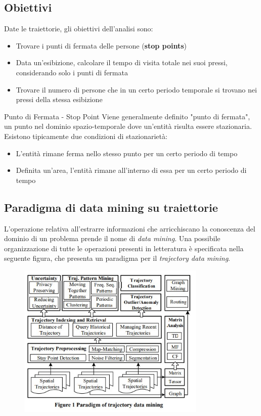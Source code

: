 \documentclass[12pt]{article}
\begin{document}
\subsection{Obiettivi}
Date le traiettorie, gli obiettivi dell'analisi sono:
\begin{itemize}
    \item Trovare i punti di fermata delle persone (\textbf{stop points})
    \item Data un'esibizione, calcolare il tempo di visita totale nei suoi pressi, considerando solo i punti di fermata
    \item Trovare il numero di persone che in un certo periodo temporale si trovano nei pressi della stessa esibizione
\end{itemize}
\begin{definition}{Punto di Fermata - Stop Point}{}
    Viene generalmente definito "punto di fermata", un punto nel dominio spazio-temporale dove un'entità risulta essere stazionaria. Esistono tipicamente due condizioni di stazionarietà:
    \begin{itemize}
        \item L'entità rimane ferma nello stesso punto per un certo periodo di tempo
        \item Definita un'area, l'entità rimane all'interno di essa per un certo periodo di tempo
    \end{itemize}
\end{definition}
\subsection{Paradigma di data mining su traiettorie}
L'operazione relativa all'estrarre informazioni che arricchiscano la conoscenza del dominio di un problema prende il nome di \textit{data mining}. Una possibile organizzazione di tutte le operazioni presenti in letteratura è specificata nella seguente figura, che presenta un paradigma per il \textit{trajectory data mining}.
\begin{figure}[htb!]
    \centering
    \includegraphics[width=0.8\textwidth]{images/datamining.jpg}
\end{figure}
\FloatBarrier
\newpage
\end{document}
